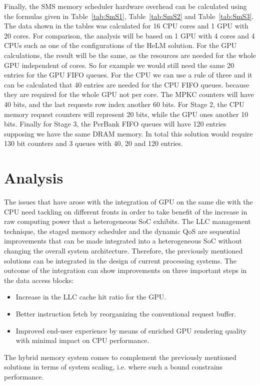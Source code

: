 \documentclass[10pt,journal,compsoc]{IEEEtran}
\begin{document}
Finally, the SMS memory scheduler hardware overhead can be calculated using the formulas given in Table~\ref{tab:SmS1}, Table~\ref{tab:SmS2} and Table~\ref{tab:SmS3}. The data shown in the tables was calculated for 16 CPU cores and 1 GPU with 20 cores. For comparison, the analysis will be based on 1 GPU with 4 cores and 4 CPUs such as one of the configurations of the HeLM solution. For the GPU calculations, the result will be the same, as the resources are needed for the whole GPU independent of cores. So for example we would still need the same 20 entries for the GPU FIFO queues. For the CPU we can use a rule of three and it can be calculated that 40 entries are needed for the CPU FIFO queues. because they are required for the whole GPU not per core. The MPKC counters will have 40 bits, and the last requests row index another 60 bits. For Stage 2, the CPU memory request counters will represent 20 bits, while the GPU ones another 10 bits. Finally for Stage 3, the PerBank FIFO queues will have 120 entries supposing we have the same DRAM memory. In total this solution would require 130 bit counters and 3 queues with 40, 20 and 120 entries.

\section{Analysis}
The issues that have arose with the integration of GPU on the same die with the CPU need tackling on different fronts in order to take benefit of the increase in raw computing power that a heterogeneous SoC exhibits. 
The LLC management technique, the staged memory scheduler and the dynamic QoS are sequential improvements that can be made integrated into a heterogeneous SoC without changing the overall system architecture. Therefore, the previously mentioned solutions can be integrated in the design of current processing systems. The outcome of the integration can show improvements on three important steps in the data access blocks:
\begin{itemize}
	\item
	Increase in the LLC cache hit ratio for the GPU.
	\item
	Better instruction fetch by reorganizing the conventional request buffer.
	\item
	Improved end-user experience by means of enriched GPU rendering quality with minimal impact on CPU performance.
\end{itemize}

The hybrid memory system comes to complement the previously mentioned solutions in terms of system scaling, i.e. where such a bound constrains performance.
\end{document}
